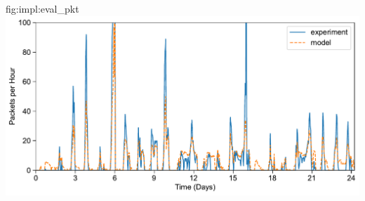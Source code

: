 \begin{definefigure}{fig:impl:eval_pkt}
    \centering
    \includegraphics[width=\linewidth]{figs/capacity/experiment_pkt/exp_vs_sim_pkt}
    \label{fig:eval:pkt}
    \caption{Performance comparison of model expectation versus real batteryless system. 
    Data from a three month deployment of two systems is used to verify our model.
    We use three weeks of illuminance measurements %
    to estimate irradiance and model the number of packets transmitted by an
    batteryless node. Average daily error is 15\%, with a standard deviation
    of 17\%. 
    } 
\end{definefigure}

